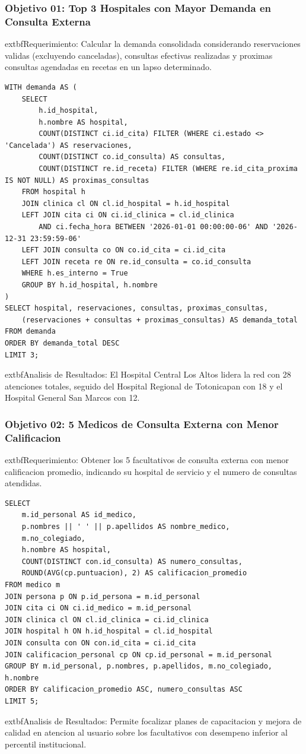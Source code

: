 \documentclass[11pt,a4paper]{article}
\begin{document}
\subsubsection{Objetivo 01: Top 3 Hospitales con Mayor Demanda en Consulta Externa}
	extbf{Requerimiento:} Calcular la demanda consolidada considerando reservaciones validas (excluyendo canceladas), consultas efectivas realizadas y proximas consultas agendadas en recetas en un lapso determinado.
\begin{lstlisting}[style=sqlstyle]
WITH demanda AS (
    SELECT 
        h.id_hospital,
        h.nombre AS hospital,
        COUNT(DISTINCT ci.id_cita) FILTER (WHERE ci.estado <> 'Cancelada') AS reservaciones,
        COUNT(DISTINCT co.id_consulta) AS consultas,
        COUNT(DISTINCT re.id_receta) FILTER (WHERE re.id_cita_proxima IS NOT NULL) AS proximas_consultas
    FROM hospital h
    JOIN clinica cl ON cl.id_hospital = h.id_hospital
    LEFT JOIN cita ci ON ci.id_clinica = cl.id_clinica 
        AND ci.fecha_hora BETWEEN '2026-01-01 00:00:00-06' AND '2026-12-31 23:59:59-06'
    LEFT JOIN consulta co ON co.id_cita = ci.id_cita
    LEFT JOIN receta re ON re.id_consulta = co.id_consulta
    WHERE h.es_interno = True
    GROUP BY h.id_hospital, h.nombre
)
SELECT hospital, reservaciones, consultas, proximas_consultas,
    (reservaciones + consultas + proximas_consultas) AS demanda_total
FROM demanda
ORDER BY demanda_total DESC
LIMIT 3;
\end{lstlisting}
	extbf{Analisis de Resultados:} El Hospital Central Los Altos lidera la red con 28 atenciones totales, seguido del Hospital Regional de Totonicapan con 18 y el Hospital General San Marcos con 12.

\subsubsection{Objetivo 02: 5 Medicos de Consulta Externa con Menor Calificacion}
	extbf{Requerimiento:} Obtener los 5 facultativos de consulta externa con menor calificacion promedio, indicando su hospital de servicio y el numero de consultas atendidas.
\begin{lstlisting}[style=sqlstyle]
SELECT 
    m.id_personal AS id_medico,
    p.nombres || ' ' || p.apellidos AS nombre_medico,
    m.no_colegiado,
    h.nombre AS hospital,
    COUNT(DISTINCT con.id_consulta) AS numero_consultas,
    ROUND(AVG(cp.puntuacion), 2) AS calificacion_promedio
FROM medico m
JOIN persona p ON p.id_persona = m.id_personal
JOIN cita ci ON ci.id_medico = m.id_personal
JOIN clinica cl ON cl.id_clinica = ci.id_clinica
JOIN hospital h ON h.id_hospital = cl.id_hospital
JOIN consulta con ON con.id_cita = ci.id_cita
JOIN calificacion_personal cp ON cp.id_personal = m.id_personal
GROUP BY m.id_personal, p.nombres, p.apellidos, m.no_colegiado, h.nombre
ORDER BY calificacion_promedio ASC, numero_consultas ASC
LIMIT 5;
\end{lstlisting}
	extbf{Analisis de Resultados:} Permite focalizar planes de capacitacion y mejora de calidad en atencion al usuario sobre los facultativos con desempeno inferior al percentil institucional.
\end{document}

